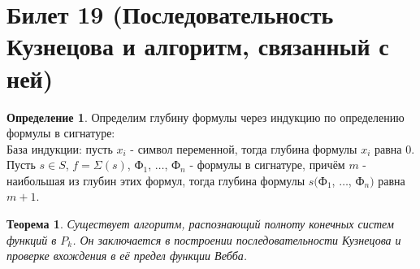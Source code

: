\documentclass[a4paper, 12pt]{article}
\theoremstyle{definition}
\newtheorem*{definition}{Определение}
\theoremstyle{plain}
\newtheorem*{theorem}{Теорема}
\theoremstyle{remark}
\begin{document}
  \section{Билет 19 (Последовательность Кузнецова и алгоритм, связанный с ней)}
  \begin{definition}
    Определим глубину формулы через индукцию по определению формулы в сигнатуре:\\
    База индукции: пусть $x_i$ - символ переменной, тогда глубина формулы $x_i$ равна 0.\\
    Пусть $s\in S$, $f=\Sigma(s)$, Ф$_1$, $\ldots$, Ф$_n$ - формулы в сигнатуре, причём $m$ - наибольшая из глубин этих формул, тогда глубина формулы $s($Ф$_1$, $\ldots$, Ф$_n)$ равна $m+1$.
  \end{definition}
  \begin{theorem}
    Существует алгоритм, распознающий полноту конечных систем функций в $P_k$. Он заключается в построении последовательности Кузнецова и проверке вхождения в её предел функции Вебба.
  \end{theorem}
\end{document}
